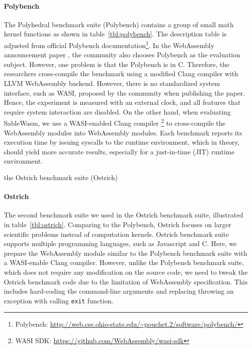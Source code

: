 \paragraph{Polybench}
The Polyhedral benchmark suite (Polybench) \cite{polybench} contains a group of small math kernel functions as shown in table~\ref{tbl:polybench}. The description table is adjusted from official Polybench documentation\footnote{Polybench: \url{http://web.cse.ohio-state.edu/~pouchet.2/software/polybench/}}. In the WebAssembly announcement paper \cite{10.1145/3062341.3062363}, the community also chooses Polybench as the evaluation subject. However, one problem is that the Polybench is in C. Therefore, the researchers cross-compile the benchmark using a modified Clang compiler with LLVM WebAssembly backend. However, there is no standardized system interface, such as WASI, proposed by the community when publishing the paper. Hence, the experiment is measured with an external clock, and all features that require system interaction are disabled. On the other hand, when evaluating SableWasm, we use a WASI-enabled Clang compiler \footnote{WASI SDK: \url{https://github.com/WebAssembly/wasi-sdk}} to cross-compile the WebAssembly modules into WebAssembly modules. Each benchmark reports its execution time by issuing syscalls to the runtime environment, which in theory, should yield more accurate results, especially for a just-in-time (JIT) runtime environment.

\begin{table}
    \centering
    
    \caption{the Ostrich benchmark suite (Ostrich)}
    \label{tbl:ostrich}
\end{table}

\paragraph{Ostrich}
The second benchmark suite we used in the Ostrich benchmark suite\cite{ostrich}, illustrated in table~\ref{tbl:ostrich}. Comparing to the Polybench, Ostrich focuses on larger scientific problems instead of computation kernels. Ostrich benchmark suite supports multiple programming languages, such as Javascript and C. Here, we prepare the WebAssembly module similar to the Polybench benchmark suite with a WASI-enable Clang compiler. However, unlike the Polybench benchmark suite, which does not require any modification on the source code, we need to tweak the Ostrich benchmark code due to the limitation of WebAssembly specification. This includes hard-coding the command-line arguments and replacing throwing an exception with calling \texttt{exit} function.

